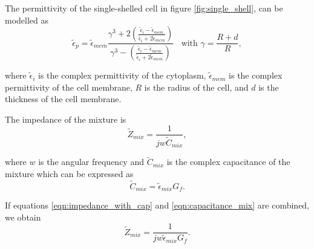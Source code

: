   \par The permittivity of the single-shelled cell in figure \ref{fig:single_shell}, can be modelled as
  \begin{equation}
      \tilde{\epsilon}_p = \tilde{\epsilon}_{mem} 
      \frac{\gamma^3+2(\frac{\tilde{\epsilon}_i - \tilde{\epsilon}_{mem}}
      {\tilde{\epsilon}_i + 2\tilde{\epsilon}_{mem}})}{\gamma^3 - (\frac{\tilde{\epsilon}_i - \tilde{\epsilon}_{mem}}{\tilde{\epsilon}_i + 2\tilde{\epsilon}_{mem}})} \;\;\text{  with } 
      \gamma = \frac{R + d}{R}, 
  \end{equation}
  
  \noindent where $\tilde{\epsilon}_i$ is the complex permittivity of the cytoplasm, $\tilde{\epsilon}_{mem}$ is the complex permittivity of the cell membrane, $R$ is the radius of the cell, and $d$ is the thickness of the cell membrane.
  
  
  
  
  \par The impedance of the mixture is
  \begin{equation}
    \tilde{Z}_{mix} = \frac{1}{jw\tilde{C}_{mix}},
    \label{eqn:impedance_with_cap}
  \end{equation}
  
  \noindent where $w$ is the angular frequency and $\tilde{C}_{mix}$ is the complex capacitance of the mixture which can be expressed as
  \begin{equation}
      \tilde{C}_{mix} = \tilde{\epsilon}_{mix} G_f.
      \label{eqn:capacitance_mix}
  \end{equation}
  
  \noindent If equations \ref{eqn:impedance_with_cap} and \ref{eqn:capacitance_mix} are combined, we obtain
  \begin{equation}
    \tilde{Z}_{mix} = \frac{1}{jw\tilde{\epsilon}_{mix}G_f}.
    \label{eqn:impedance_with_Gf}
  \end{equation}
  
